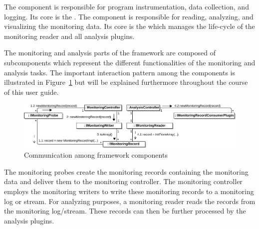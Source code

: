 \noindent The \KiekerMonitoringPart{} component is responsible for program instrumentation, data collection, and logging. Its core is the . %
%
The component \KiekerAnalysisPart{} is responsible for reading, analyzing, and visualizing the monitoring data. Its core is the  which manages the life-cycle of the monitoring reader and all analysis plugins.

The monitoring and analysis parts of the \Kieker{} framework are composed of subcomponents which represent the different functionalities of the monitoring and analysis tasks. The important interaction pattern among the components is illustrated in Figure~\ref{fig:KiekerCommunicationDiagram} but will be explained furthermore throughout the course of this user guide. 

\vspace{1cm}

\begin{figure}[H]\centering
\includegraphics[width=1\textwidth]{images/kiekerCommunications-revisedReArranged-woMonitoringLog-bw-newNames}
\caption{Communication among \Kieker{} framework components}
\label{fig:KiekerCommunicationDiagram}
\end{figure}

\vspace{1cm}

\noindent The monitoring probes create the monitoring records containing the %
monitoring data and deliver them to the monitoring controller. %
The monitoring controller employs the monitoring writers to write these %
monitoring records to a monitoring log or stream. %
For analyzing purposes, a monitoring reader reads the records from the monitoring log/stream. %
These records can then be further processed by the analysis plugins.


